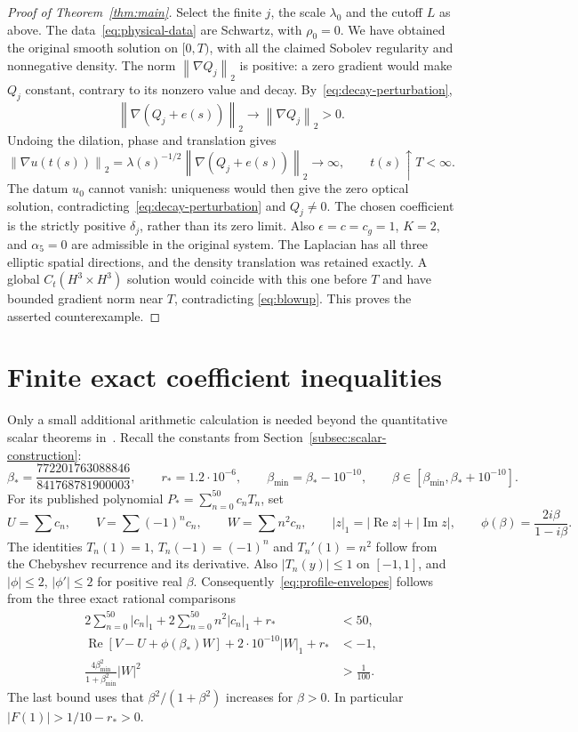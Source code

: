 \documentclass[11pt]{article}
\numberwithin{equation}{section}
\theoremstyle{remark}
\newcommand{\norm}[1]{\left\|#1\right\|}
\newcommand{\eps}{\epsilon}
\DeclareMathOperator{\Rea}{Re}
\DeclareMathOperator{\Ima}{Im}
\begin{document}
\begin{proof}[Proof of Theorem~\ref{thm:main}]
Select the finite $j$, the scale $\lambda_0$ and the cutoff $L$ as above.
The data~\eqref{eq:physical-data} are Schwartz, with $\rho_0=0$.
We have obtained the original smooth solution on $[0,T)$, with all the
claimed Sobolev regularity and nonnegative density.
The norm $\norm{\nabla Q_j}_2$ is positive: a zero gradient would make
$Q_j$ constant, contrary to its nonzero value and decay.
By~\eqref{eq:decay-perturbation},
\[
 \norm{\nabla(Q_j+e(s))}_2\longrightarrow\norm{\nabla Q_j}_2>0.
\]
Undoing the dilation, phase and translation gives
\begin{equation}\label{eq:blowup}
 \norm{\nabla u(t(s))}_2
       =\lambda(s)^{-1/2}\norm{\nabla(Q_j+e(s))}_2
       \longrightarrow\infty,\qquad t(s)\uparrow T<\infty.
\end{equation}
The datum $u_0$ cannot vanish: uniqueness would then give the zero
optical solution, contradicting~\eqref{eq:decay-perturbation} and
$Q_j\ne0$.
The chosen coefficient is the strictly positive $\delta_j$, rather than
its zero limit. Also $\eps=c=c_g=1$, $K=2$, and $\alpha_5=0$ are
admissible in the original system. The Laplacian has all three elliptic
spatial directions, and the density translation was retained exactly.
A global $C_t(H^3\times H^3)$ solution would coincide with this one
before $T$ and have bounded gradient norm near $T$, contradicting
\eqref{eq:blowup}. This proves the asserted counterexample.
\end{proof}

\appendix
\section{Finite exact coefficient inequalities}\label{app:arithmetic}

Only a small additional arithmetic calculation is needed beyond the
quantitative scalar theorems in~\cite{DS}. Recall the constants from
Section~\ref{subsec:scalar-construction}:
\[
 \beta_*=\frac{772201763088846}{841768781900003},\qquad
 r_*=1.2\cdot10^{-6},\qquad
 \beta_{\min}=\beta_*-10^{-10},\qquad
 \beta\in[\beta_{\min},\beta_*+10^{-10}].
\]
For its published polynomial
$P_* =\sum_{n=0}^{50}c_nT_n$, set
\[
 U=\sum c_n,\qquad V=\sum(-1)^nc_n,\qquad W=\sum n^2c_n,
 \qquad |z|_1=|\Rea z|+|\Ima z|,
 \qquad \phi(\beta)=\frac{2i\beta}{1-i\beta}.
\]
The identities $T_n(1)=1$, $T_n(-1)=(-1)^n$ and $T_n'(1)=n^2$
follow from the Chebyshev recurrence and its derivative.
Also $|T_n(y)|\le1$ on $[-1,1]$, and
$|\phi|\le2$, $|\phi'|\le2$ for positive real $\beta$.
Consequently~\eqref{eq:profile-envelopes} follows from the three exact
rational comparisons
\begin{align}
 2\sum_{n=0}^{50}|c_n|_1+2\sum_{n=0}^{50}n^2|c_n|_1+r_*&<50,
 \label{eq:finite-envelope}\\
 \Rea[V-U+\phi(\beta_*)W]+2\cdot10^{-10}|W|_1+r_*&<-1,
 \label{eq:finite-origin}\\
 \frac{4\beta_{\min}^2}{1+\beta_{\min}^2}|W|^2&>\frac1{100}.
 \label{eq:finite-tail}
\end{align}
The last bound uses that $\beta^2/(1+\beta^2)$ increases for $\beta>0$.
In particular $|F(1)|>1/10-r_*>0$.
\end{document}

